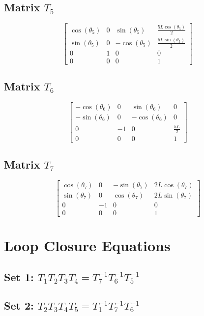 \documentclass[12pt, a4paper]{article}
\begin{document}
\subsection*{Matrix $T_{5}$}
\[ \left[\begin{matrix}\cos{\left(\theta_{5} \right)} & 0 & \sin{\left(\theta_{5} \right)} & \frac{5 L \cos{\left(\theta_{5} \right)}}{2}\\\sin{\left(\theta_{5} \right)} & 0 & - \cos{\left(\theta_{5} \right)} & \frac{5 L \sin{\left(\theta_{5} \right)}}{2}\\0 & 1 & 0 & 0\\0 & 0 & 0 & 1\end{matrix}\right] \]
\subsection*{Matrix $T_{6}$}
\[ \left[\begin{matrix}- \cos{\left(\theta_{6} \right)} & 0 & \sin{\left(\theta_{6} \right)} & 0\\- \sin{\left(\theta_{6} \right)} & 0 & - \cos{\left(\theta_{6} \right)} & 0\\0 & -1 & 0 & \frac{5 L}{2}\\0 & 0 & 0 & 1\end{matrix}\right] \]
\subsection*{Matrix $T_{7}$}
\[ \left[\begin{matrix}\cos{\left(\theta_{7} \right)} & 0 & - \sin{\left(\theta_{7} \right)} & 2 L \cos{\left(\theta_{7} \right)}\\\sin{\left(\theta_{7} \right)} & 0 & \cos{\left(\theta_{7} \right)} & 2 L \sin{\left(\theta_{7} \right)}\\0 & -1 & 0 & 0\\0 & 0 & 0 & 1\end{matrix}\right] \]

\section{Loop Closure Equations}
\subsection{Set 1: $T_{1}T_{2}T_{3}T_{4} = T_{7}^{-1}T_{6}^{-1}T_{5}^{-1}$}
\subsection{Set 2: $T_{2}T_{3}T_{4}T_{5} = T_{1}^{-1}T_{7}^{-1}T_{6}^{-1}$}
\end{document}
